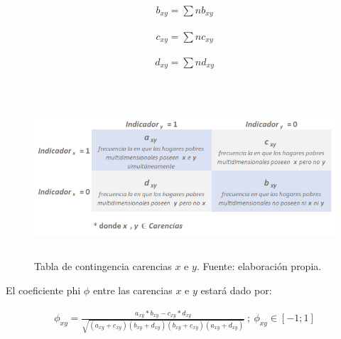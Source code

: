 \documentclass[12pt,letterpaper,spanish]{article}
\begin{document}
\begin{enumerate}
\begin{equation} \label{nb}
\begin{split}
b_{xy}=\sum nb_{xy}
\end{split}
\end{equation}

\begin{equation} \label{nc}
\begin{split}
c_{xy}=\sum nc_{xy}
\end{split}
\end{equation}

\begin{equation} \label{nd}
\begin{split}
d_{xy}=\sum nd_{xy}
\end{split}
\end{equation}\\


\begin{figure}[H]
    \centering
    \includegraphics[height=6cm]{Max/tabla_contingencia2.png}
    \caption{Tabla de contingencia carencias $x$ e $y$. Fuente: elaboración propia.}
    \label{tabla_contingencia}
\end{figure}


El coeficiente phi $\phi$ entre las carencias $x$ e $y$ estará dado por:

\begin{equation} \label{calculophi}
\begin{split}
\phi_{xy}=\frac{a_{xy}*b_{xy}-c_{xy}*d_{xy}}{\sqrt{(a_{xy}+c_{xy})(b_{xy}+d_{xy})(b_{xy}+c_{xy})(a_{xy}+d_{xy})}} \: ;\: \phi_{xy} \in [-1;1]
\end{split}
\end{equation}\\




\end{enumerate}
\end{document}
